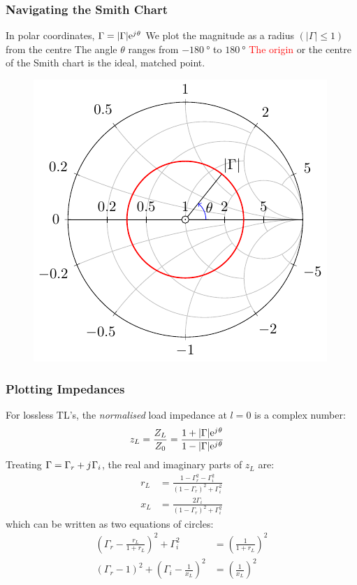 \documentclass[10pt, compress]{beamer}
\newcommand{\e}{\mathrm{e}} %
\renewcommand{\j}{{j}\mkern1mu} %
\begin{document}
\begin{frame}
    \frametitle{Navigating the Smith Chart}
    \begin{outline}
        \1 In polar coordinates, $\Gamma = |\Gamma| \e^{\j \theta}$
        \1 We plot the magnitude as a radius $(|\Gamma| \le 1)$ from the centre
        \1 The angle $\theta$ ranges from $\SI{-180}{\degree}$ to $\SI{180}{\degree}$
        \1 \textcolor{red}{The origin} or the centre of the Smith chart is the ideal, matched point.
    \end{outline}
    \begin{figure}[htbp]
        \centering
        \includegraphics[width=.5\textwidth]{smith_simple_gamme.pdf}
    \end{figure}
\end{frame}

\begin{frame}
    \frametitle{Plotting Impedances}
    For lossless TL's, the \textit{normalised} load impedance at $l = 0$ is a complex number:
    \begin{align*}
        z_L  = \frac{Z_L}{Z_0} & = \frac{1 + |\Gamma|\e^{\j \theta}}{1 - |\Gamma|\e^{\j \theta}}
    \end{align*}
    Treating $\Gamma = \Gamma_r + \j \Gamma_i$, the real and imaginary parts of $z_L$ are:
    \begin{align*}
        r_{L} & = \frac{1-\Gamma_{r}^{2}-\Gamma_{i}^{2}}{\left(1-\Gamma_{r}\right)^{2}+\Gamma_{i}^{2}} \\
        x_{L} & = \frac{2 \Gamma_{i}}{\left(1-\Gamma_{r}\right)^{2}+\Gamma_{i}^{2}}
    \end{align*}
    which can be written as two equations of circles:
    \begin{align*}
        \left(\Gamma_{r} - \frac{r_{L}}{1+r_{L}}\right)^{2} + \Gamma_{i}^{2}      & = \left(\frac{1}{1+r_{L}}\right)^{2} \tag{Resistance Circle} \\
        \left(\Gamma_{r}-1\right)^{2}+\left(\Gamma_{i}-\frac{1}{x_{L}}\right)^{2} & =\left(\frac{1}{x_{L}}\right)^{2} \tag{Reactance Circle}
    \end{align*}
\end{frame}
\end{document}
